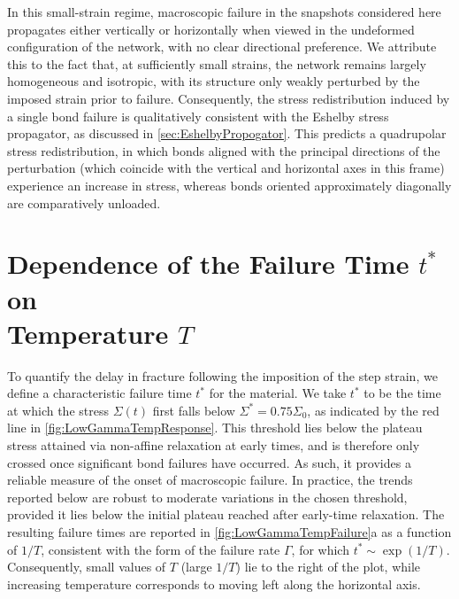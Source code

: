 \documentclass[asymmetricmargins]{library/duthesis}%
\providecommand{\DIFadd}[1]{{\protect\color{blue}\uwave{#1}}} %
\providecommand{\DIFdel}[1]{{\protect\color{red}\sout{#1}}}                      %
\providecommand{\DIFaddbegin}{} %
\providecommand{\DIFaddend}{} %
\providecommand{\DIFdelbegin}{} %
\providecommand{\DIFdelend}{} %
\begin{document}
In this small-strain regime, macroscopic failure in the snapshots considered here propagates either vertically or horizontally when viewed in the undeformed configuration of the network, with no clear directional preference. We attribute this to the fact that, at sufficiently small strains, the network remains largely homogeneous and isotropic, with its structure only weakly perturbed by the imposed strain prior to failure. Consequently, the stress redistribution induced by a single bond failure is qualitatively consistent with the Eshelby stress propagator, as discussed in \cref{sec:EshelbyPropogator}. This predicts a quadrupolar stress redistribution, in which bonds aligned with the principal directions of the perturbation (which coincide with the vertical and horizontal axes in this frame) experience an increase in stress, whereas bonds oriented approximately diagonally are comparatively unloaded.

\section[Dependence of the Failure Time \texorpdfstring{$t^*$}{t*} on  Temperature \texorpdfstring{$T$}{T}]{Dependence of the Failure Time \texorpdfstring{$t^*$}{t*} on \\ Temperature \texorpdfstring{$T$}{T}} \label{sec:LowGammaTemp}

To quantify the delay in fracture following the imposition of the step strain, we define a characteristic failure time $t^*$ for the material. We take $t^*$ to be the time at which the stress $\Sigma(t)$ first falls below $\Sigma^*=0.75\Sigma_0$, as indicated by the red line in \cref{fig:LowGammaTempResponse}. This threshold lies below the plateau stress attained via non-affine relaxation at early times, and is therefore only crossed once significant bond failures have occurred. As such, it provides a reliable measure of the onset of macroscopic failure. In practice, the trends reported below are robust to moderate variations in the chosen threshold, provided it lies below the initial plateau reached after early-time relaxation. The resulting failure times are reported in \cref{fig:LowGammaTempFailure}a as a function of $1/T$, consistent with the form of the failure rate $\Gamma$, for which \DIFdelbegin \DIFdel{$t^* \sim \exp(1/T)$}\DIFdelend \DIFaddbegin \DIFadd{$t^* \sim \exp(A/T)$ where $A$ is an apparent activation parameter}\DIFaddend . Consequently, small values of $T$ (large $1/T$) lie to the right of the plot, while increasing temperature corresponds to moving left along the horizontal axis.
\end{document}
